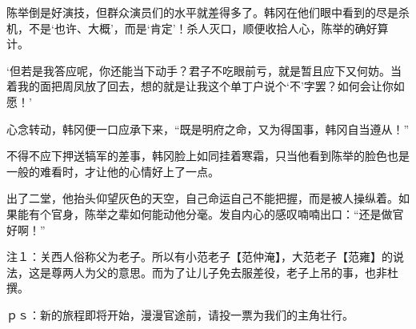 陈举倒是好演技，但群众演员们的水平就差得多了。韩冈在他们眼中看到的尽是杀机，不是‘也许、大概’，而是‘肯定’！杀人灭口，顺便收拾人心，陈举的确好算计。

‘但若是我答应呢，你还能当下动手？君子不吃眼前亏，就是暂且应下又何妨。当着我的面把周凤放了回去，想的就是让我这个单丁户说个‘不’字罢？如何会让你如愿！’

心念转动，韩冈便一口应承下来，“既是明府之命，又为得国事，韩冈自当遵从！”

不得不应下押送犒军的差事，韩冈脸上如同挂着寒霜，只当他看到陈举的脸色也是一般的难看时，才让他的心情好上了一点。

出了二堂，他抬头仰望灰色的天空，自己命运自己不能把握，而是被人操纵着。如果能有个官身，陈举之辈如何能动他分毫。发自内心的感叹喃喃出口：“还是做官好啊！”

注１：关西人俗称父为老子。所以有小范老子【范仲淹】，大范老子【范雍】的说法，这是尊两人为父的意思。而为了让儿子免去服差役，老子上吊的事，也非杜撰。

ｐｓ：新的旅程即将开始，漫漫官途前，请投一票为我们的主角壮行。

